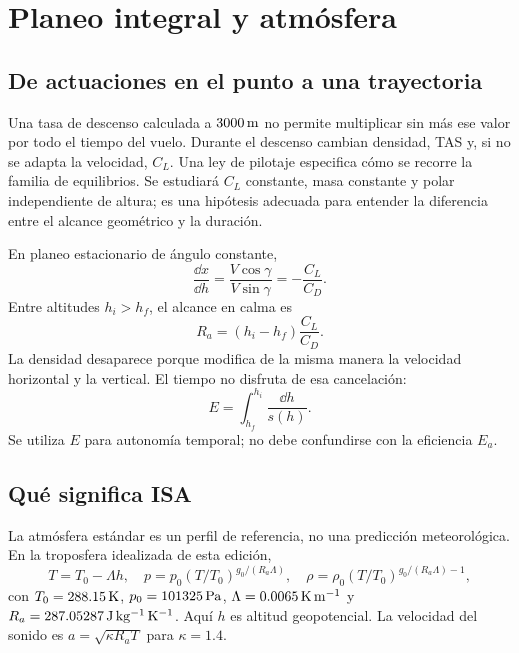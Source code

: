 \chapter{Planeo integral y atmósfera}\label{ch:planeo-integral}

\section{De actuaciones en el punto a una trayectoria}
Una tasa de descenso calculada a $3000\,\mathrm{m}$ no permite multiplicar sin más ese valor por todo el tiempo del vuelo. Durante el descenso cambian densidad, TAS y, si no se adapta la velocidad, $C_L$. Una ley de pilotaje especifica cómo se recorre la familia de equilibrios. Se estudiará $C_L$ constante, masa constante y polar independiente de altura; es una hipótesis adecuada para entender la diferencia entre el alcance geométrico y la duración.

En planeo estacionario de ángulo constante,
\begin{equation}
\frac{\dd x}{\dd h}=\frac{V\cos\gamma}{V\sin\gamma}
=-\frac{C_L}{C_D}.
\end{equation}
Entre altitudes $h_i>h_f$, el alcance en calma es
\begin{equation}
R_a=(h_i-h_f)\frac{C_L}{C_D}.\label{eq:glider-range}
\end{equation}
La densidad desaparece porque modifica de la misma manera la velocidad horizontal y la vertical. El tiempo no disfruta de esa cancelación:
\begin{equation}
E=\int_{h_f}^{h_i}\frac{\dd h}{s(h)}.
\label{eq:glider-time}
\end{equation}
Se utiliza $E$ para autonomía temporal; no debe confundirse con la eficiencia $E_a$.

\section{Qué significa ISA}
La atmósfera estándar es un perfil de referencia, no una predicción meteorológica. En la troposfera idealizada de esta edición,
\begin{equation}
T=T_0-\Lambda h,\quad
p=p_0(T/T_0)^{g_0/(R_a\Lambda)},\quad
\rho=\rho_0(T/T_0)^{g_0/(R_a\Lambda)-1},
\label{eq:isa-tropo}
\end{equation}
con $T_0=288.15\,\mathrm{K}$, $p_0=101325\,\mathrm{Pa}$, $\Lambda=0.0065\,\mathrm{K\,m^{-1}}$ y $R_a=287.05287\,\mathrm{J\,kg^{-1}\,K^{-1}}$. Aquí $h$ es altitud geopotencial. La velocidad del sonido es $a=\sqrt{\kappa R_aT}$ para $\kappa=1.4$.

